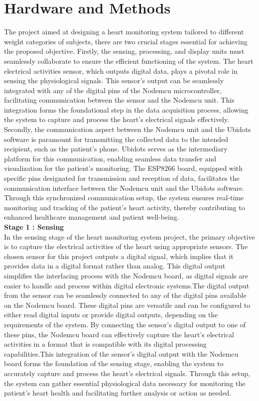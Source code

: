 \section{Hardware and Methods}
The project aimed at designing a heart monitoring system tailored to different weight categories of subjects, there are two crucial stages essential for achieving the proposed objective. Firstly, the sensing, processing, and display units must seamlessly collaborate to ensure the efficient functioning of the system. The heart electrical activities sensor, which outputs digital data, plays a pivotal role in sensing the physiological signals. This sensor's output can be seamlessly integrated with any of the digital pins of the Nodemcu microcontroller, facilitating communication between the sensor and the Nodemcu unit. This integration forms the foundational step in the data acquisition process, allowing the system to capture and process the heart's electrical signals effectively.
Secondly, the communication aspect between the Nodemcu unit and the Ubidots \cite{mohammed2021real} software is paramount for transmitting the collected data to the intended recipient, such as the patient's phone. Ubidots serves as the intermediary platform for this communication, enabling seamless data transfer and visualization for the patient's monitoring. The ESP8266 board, equipped with specific pins designated for transmission and reception of data, facilitates the communication interface between the Nodemcu unit and the Ubidots software. Through this synchronized communication setup, the system ensures real-time monitoring and tracking of the patient's heart activity, thereby contributing to enhanced healthcare management and patient well-being.
\\
\textbf{Stage 1 : Sensing}
\\
In the sensing stage of the heart monitoring system project, the primary objective is to capture the electrical activities of the heart using appropriate sensors. The chosen sensor for this project outputs a digital signal, which implies that it provides data in a digital format rather than analog. This digital output simplifies the interfacing process with the Nodemcu board, as digital signals are easier to handle and process within digital electronic systems.The digital output from the sensor can be seamlessly connected to any of the digital pins available on the Nodemcu board. These digital pins are versatile and can be configured to either read digital inputs or provide digital outputs, depending on the requirements of the system. By connecting the sensor's digital output to one of these pins, the Nodemcu board can effectively capture the heart's electrical activities in a format that is compatible with its digital processing capabilities.This integration of the sensor's digital output with the Nodemcu board forms the foundation of the sensing stage, enabling the system to accurately capture and process the heart's electrical signals. Through this setup, the system can gather essential physiological data necessary for monitoring the patient's heart health and facilitating further analysis or action as needed.
\\

